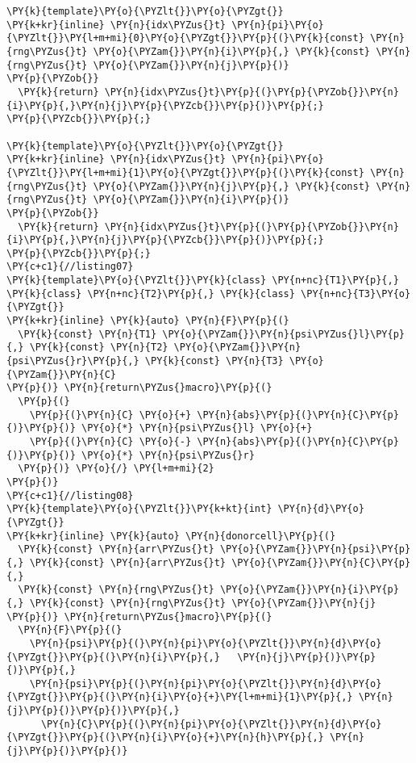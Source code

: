 \begin{Verbatim}[commandchars=\\\{\}]
\PY{k}{template}\PY{o}{\PYZlt{}}\PY{o}{\PYZgt{}}
\PY{k+kr}{inline} \PY{n}{idx\PYZus{}t} \PY{n}{pi}\PY{o}{\PYZlt{}}\PY{l+m+mi}{0}\PY{o}{\PYZgt{}}\PY{p}{(}\PY{k}{const} \PY{n}{rng\PYZus{}t} \PY{o}{\PYZam{}}\PY{n}{i}\PY{p}{,} \PY{k}{const} \PY{n}{rng\PYZus{}t} \PY{o}{\PYZam{}}\PY{n}{j}\PY{p}{)} 
\PY{p}{\PYZob{}}
  \PY{k}{return} \PY{n}{idx\PYZus{}t}\PY{p}{(}\PY{p}{\PYZob{}}\PY{n}{i}\PY{p}{,}\PY{n}{j}\PY{p}{\PYZcb{}}\PY{p}{)}\PY{p}{;}
\PY{p}{\PYZcb{}}\PY{p}{;}

\PY{k}{template}\PY{o}{\PYZlt{}}\PY{o}{\PYZgt{}}
\PY{k+kr}{inline} \PY{n}{idx\PYZus{}t} \PY{n}{pi}\PY{o}{\PYZlt{}}\PY{l+m+mi}{1}\PY{o}{\PYZgt{}}\PY{p}{(}\PY{k}{const} \PY{n}{rng\PYZus{}t} \PY{o}{\PYZam{}}\PY{n}{j}\PY{p}{,} \PY{k}{const} \PY{n}{rng\PYZus{}t} \PY{o}{\PYZam{}}\PY{n}{i}\PY{p}{)} 
\PY{p}{\PYZob{}}
  \PY{k}{return} \PY{n}{idx\PYZus{}t}\PY{p}{(}\PY{p}{\PYZob{}}\PY{n}{i}\PY{p}{,}\PY{n}{j}\PY{p}{\PYZcb{}}\PY{p}{)}\PY{p}{;}
\PY{p}{\PYZcb{}}\PY{p}{;} 
\PY{c+c1}{//listing07}
\PY{k}{template}\PY{o}{\PYZlt{}}\PY{k}{class} \PY{n+nc}{T1}\PY{p}{,} \PY{k}{class} \PY{n+nc}{T2}\PY{p}{,} \PY{k}{class} \PY{n+nc}{T3}\PY{o}{\PYZgt{}} 
\PY{k+kr}{inline} \PY{k}{auto} \PY{n}{F}\PY{p}{(}
  \PY{k}{const} \PY{n}{T1} \PY{o}{\PYZam{}}\PY{n}{psi\PYZus{}l}\PY{p}{,} \PY{k}{const} \PY{n}{T2} \PY{o}{\PYZam{}}\PY{n}{psi\PYZus{}r}\PY{p}{,} \PY{k}{const} \PY{n}{T3} \PY{o}{\PYZam{}}\PY{n}{C}
\PY{p}{)} \PY{n}{return\PYZus{}macro}\PY{p}{(}
  \PY{p}{(}
    \PY{p}{(}\PY{n}{C} \PY{o}{+} \PY{n}{abs}\PY{p}{(}\PY{n}{C}\PY{p}{)}\PY{p}{)} \PY{o}{*} \PY{n}{psi\PYZus{}l} \PY{o}{+} 
    \PY{p}{(}\PY{n}{C} \PY{o}{-} \PY{n}{abs}\PY{p}{(}\PY{n}{C}\PY{p}{)}\PY{p}{)} \PY{o}{*} \PY{n}{psi\PYZus{}r}
  \PY{p}{)} \PY{o}{/} \PY{l+m+mi}{2}
\PY{p}{)}
\PY{c+c1}{//listing08}
\PY{k}{template}\PY{o}{\PYZlt{}}\PY{k+kt}{int} \PY{n}{d}\PY{o}{\PYZgt{}}  
\PY{k+kr}{inline} \PY{k}{auto} \PY{n}{donorcell}\PY{p}{(} 
  \PY{k}{const} \PY{n}{arr\PYZus{}t} \PY{o}{\PYZam{}}\PY{n}{psi}\PY{p}{,} \PY{k}{const} \PY{n}{arr\PYZus{}t} \PY{o}{\PYZam{}}\PY{n}{C}\PY{p}{,} 
  \PY{k}{const} \PY{n}{rng\PYZus{}t} \PY{o}{\PYZam{}}\PY{n}{i}\PY{p}{,} \PY{k}{const} \PY{n}{rng\PYZus{}t} \PY{o}{\PYZam{}}\PY{n}{j}
\PY{p}{)} \PY{n}{return\PYZus{}macro}\PY{p}{(}
  \PY{n}{F}\PY{p}{(}
    \PY{n}{psi}\PY{p}{(}\PY{n}{pi}\PY{o}{\PYZlt{}}\PY{n}{d}\PY{o}{\PYZgt{}}\PY{p}{(}\PY{n}{i}\PY{p}{,}   \PY{n}{j}\PY{p}{)}\PY{p}{)}\PY{p}{,} 
    \PY{n}{psi}\PY{p}{(}\PY{n}{pi}\PY{o}{\PYZlt{}}\PY{n}{d}\PY{o}{\PYZgt{}}\PY{p}{(}\PY{n}{i}\PY{o}{+}\PY{l+m+mi}{1}\PY{p}{,} \PY{n}{j}\PY{p}{)}\PY{p}{)}\PY{p}{,} 
      \PY{n}{C}\PY{p}{(}\PY{n}{pi}\PY{o}{\PYZlt{}}\PY{n}{d}\PY{o}{\PYZgt{}}\PY{p}{(}\PY{n}{i}\PY{o}{+}\PY{n}{h}\PY{p}{,} \PY{n}{j}\PY{p}{)}\PY{p}{)}

\end{Verbatim}
